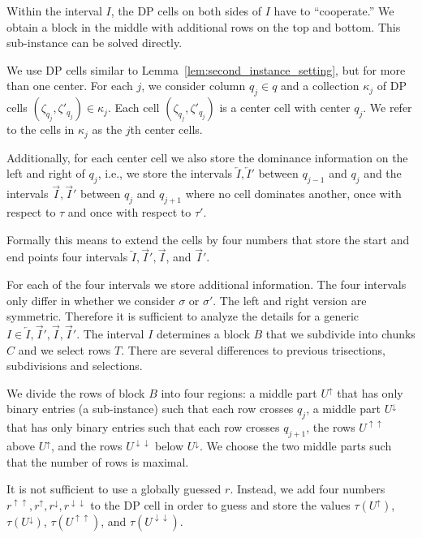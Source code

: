 Within the interval $I$, the DP cells on both sides of $I$ have to ``cooperate.''
We obtain a \BMEC block in the middle with additional rows on the top and bottom. 
This sub-instance can be solved directly.

We use DP cells similar to Lemma~\ref{lem:second_instance_setting}, but for more than one center.
For each $j$, we consider column $q_j\in q$ and a collection $\kappa_j$ of DP cells $(\zeta_{q_j},\zeta'_{q_j}) \in \kappa_j$.
Each cell $(\zeta_{q_j},\zeta'_{q_j})$ is a center cell with center $q_j$.
We refer to the cells in $\kappa_j$ as the $j$th center cells.

Additionally, for each center cell we also store the dominance information on the left and right of $q_j$, 
i.e., we store the intervals $\overleftarrow{I}, \overleftarrow{I}'$ between $q_{j-1}$ and $q_j$ and the intervals $\overrightarrow{I},\overrightarrow{I}'$ between $q_j$ and $q_{j+1}$ where no cell dominates another, once with respect to $\tau$ and  once with respect to $\tau'$.

Formally this means to extend the cells by four numbers that store the start and end points four intervals $\overleftarrow{I},\overrightarrow{I}',\overrightarrow{I}$, and $\overrightarrow{I}'$.

For each of the four intervals we store additional information.
The four intervals only differ in whether we consider $\sigma$ or $\sigma'$. The left and right version are symmetric.
Therefore it is sufficient to analyze the details for a generic $I \in \overleftarrow{I},\overrightarrow{I}',\overrightarrow{I},\overrightarrow{I}'$.
The interval ${I}$ determines a block ${B}$ that we subdivide into chunks ${C}$ and we select rows ${T}$.
There are several differences to previous trisections, subdivisions and selections.

We divide the rows of block ${B}$ into four regions: 
a middle part ${U^\uparrow}$ that has only binary entries (a \BMEC sub-instance) such that each row crosses $q_j$,
a middle part ${U^\downarrow}$ that has only binary entries such that each row crosses $q_{j+1}$,
the rows ${U}^{\uparrow\uparrow}$ above ${U}^\uparrow$, and the rows ${U}^{\downarrow\downarrow}$ below ${U}^\downarrow$.
We choose the two middle parts such that the number of rows is maximal.

It is not sufficient to use a globally guessed $r$. 
Instead, we add four numbers ${r}^{\uparrow\uparrow},{r}^\uparrow,{r}^\downarrow,{r}^{\downarrow\downarrow}$ to the DP cell in order to guess and store the values 
$\tau({U}^\uparrow)$, $\tau({U^\downarrow})$, $\tau({U^{\uparrow\uparrow}})$, and $\tau({U^{\downarrow\downarrow}})$.

